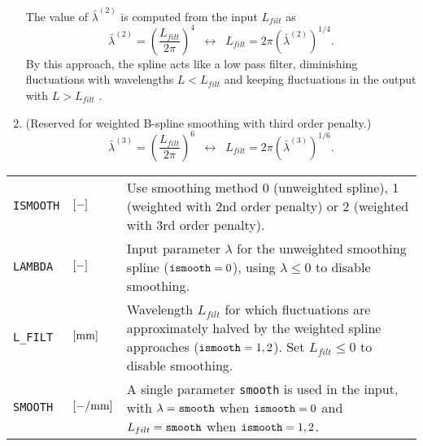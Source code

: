 \documentclass[12pt]{report}
\newenvironment{inputvars}{\vspace{0.4\baselineskip}%

\begin{tabular}{>{\raggedright}p{22mm}p{19mm}p{113mm}}}{
\end{tabular}

}
\newcommand{\inpvar}[3]{{\small\tt #1} & $#2$ & #3 \\[1ex]}
\begin{document}
\begin{enumerate}
        The value of $\bar{\lambda}^{(2)}$ is computed from the input
        $L_{filt}$ as 
\begin{equation}
        \bar{\lambda}^{(2)}=\left(\frac{L_{filt}}{2\pi}\right)^4 
                \;\;\leftrightarrow\;\;
                L_{filt} = 2\pi \left(\bar{\lambda}^{(2)}\right)^{1/4} .
\end{equation}
        By this approach, the spline
        acts like a low pass filter, diminishing fluctuations with
        wavelengths $L<L_{filt}$ and keeping fluctuations in the output
        with $L>L_{filt}$ \cite{Vollebregt2022b-cm2022}.
\item (Reserved for weighted B-spline smoothing with third order penalty.)
\begin{equation}
        \bar{\lambda}^{(3)}= \left(\frac{L_{filt}}{2\pi}\right)^6 
                \;\;\leftrightarrow\;\;
                L_{filt} = 2\pi \left(\bar{\lambda}^{(3)}\right)^{1/6} .
\end{equation}

\end{enumerate}
\begin{inputvars}
\inpvar{ISMOOTH}{\bunit{-}}{Use smoothing method 0 (unweighted spline), 1
        (weighted with 2nd order penalty) or 2 (weighted with 3rd order
        penalty).}
\inpvar{LAMBDA}{\bunit{-}}{Input parameter $\lambda$ for the unweighted
        smoothing spline (${\tt ismooth}=0$), using $\lambda\le 0$ to
        disable smoothing.}
\inpvar{L\_FILT}{\bunit{mm}}{Wavelength $L_{filt}$ for which fluctuations
        are approximately halved by the weighted spline approaches
        (${\tt ismooth}=1, 2$). Set $L_{filt}\le 0$ to disable smoothing.}
\inpvar{SMOOTH}{\bunit{-/mm}}{A single parameter {\tt smooth} is used in
        the input, with $\lambda={\tt smooth}$ when ${\tt ismooth}=0$ and
        $L_{filt}={\tt smooth}$ when ${\tt ismooth}=1, 2$.}
\end{inputvars}
\end{document}
